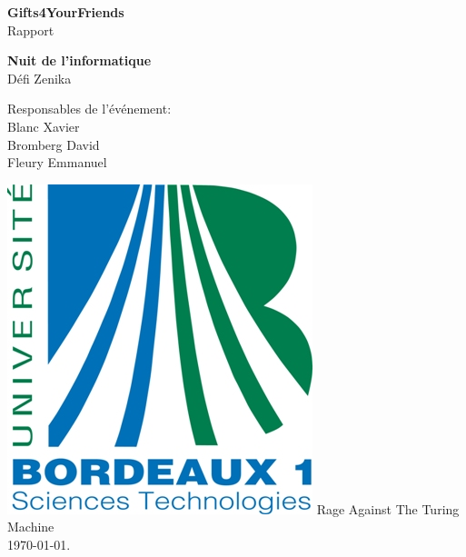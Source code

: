 \documentclass[a4paper,francais,titlepage]{report}
\begin{document}
\pagestyle{fancy}

\begin{titlepage}
 \begin{center}
	\vspace*{3.5cm}
	\Large \textbf{Gifts4YourFriends} \\
	\vspace{0.2cm}
	\small Rapport
	\vspace{2cm}

	\huge \textbf{Nuit de l'informatique} \\
	\vspace{0.3cm}
	\large {Défi Zenika}
	\vspace{1.5cm}
 \end{center}
 
 \begin{flushleft}
	\normalsize {\hspace{6cm}Responsables de l'événement: \\ 
				 \hspace{7.0cm} Blanc Xavier \\
				 \hspace{6.7cm} Bromberg David \\
				 \hspace{6.6cm} Fleury Emmanuel}
	\vspace{2cm}
 \end{flushleft}
 
   \begin{center}
   \includegraphics[scale=0.3]{logo_bx1.jpg}
   	\vfill 
   	\vspace{2cm}
	\normalsize {Rage Against The Turing Machine\\}
	\vspace{1.5cm} 
	{\today}.
 \end{center}
\end{titlepage}
\end{document}
